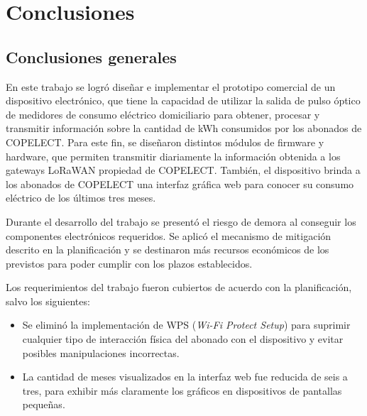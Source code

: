 
\chapter{Conclusiones} %

\label{Chapter5} %




\section{Conclusiones generales }

En este trabajo se logró diseñar e implementar el prototipo comercial de un dispositivo electrónico, que tiene la capacidad de utilizar la salida de pulso óptico de medidores de consumo eléctrico domiciliario para obtener, procesar y transmitir información sobre la cantidad de kWh consumidos por los abonados de COPELECT. Para este fin, se diseñaron distintos módulos de firmware y hardware, que permiten transmitir diariamente la información obtenida a los gateways LoRaWAN propiedad de COPELECT. También, el dispositivo brinda a los abonados de COPELECT una interfaz gráfica web para conocer su consumo eléctrico de los últimos tres meses.

Durante el desarrollo del trabajo se presentó el riesgo de demora al conseguir los componentes electrónicos requeridos. Se aplicó el mecanismo de mitigación descrito en la planificación y se destinaron más recursos económicos de los previstos para poder cumplir con los plazos establecidos.

Los requerimientos del trabajo fueron cubiertos de acuerdo con la planificación, salvo los siguientes:
\begin{itemize}
	\item Se eliminó la implementación de WPS (\textit{Wi-Fi Protect Setup}) para suprimir cualquier tipo de interacción física del abonado con el dispositivo y evitar posibles manipulaciones incorrectas.
	\item La cantidad de meses visualizados en la interfaz web fue reducida de seis a tres, para exhibir más claramente los gráficos en dispositivos de pantallas pequeñas.
\end{itemize}

